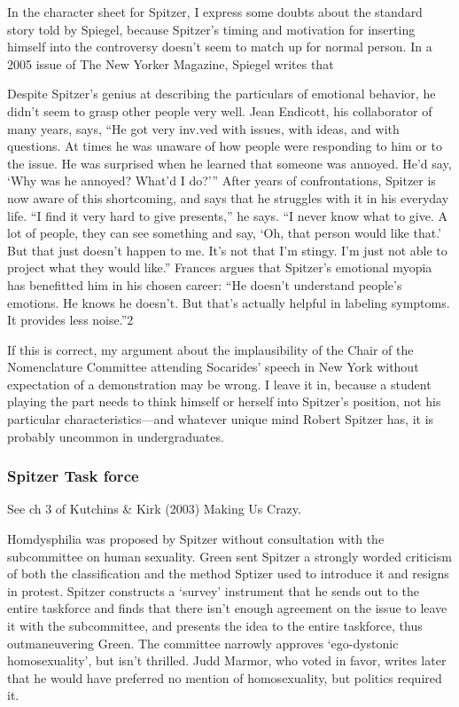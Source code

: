In the character sheet for Spitzer, I express some doubts about the standard story told by Spiegel, because Spitzer's timing and motivation for inserting himself into the controversy doesn't seem to match up for normal person. In a 2005 issue of The New Yorker Magazine, Spiegel writes that 

Despite Spitzer's genius at describing the particulars of emotional behavior, he didn't seem to grasp other people very well. Jean Endicott, his collaborator of many years, says, ``He got very inv.ved with issues, with ideas, and with questions. At times he was unaware of how people were responding to him or to the issue. He was surprised when he learned that someone was annoyed. He'd say, `Why was he annoyed? What'd I do?''' After years of confrontations, Spitzer is now aware of this shortcoming, and says that he struggles with it in his everyday life. ``I find it very hard to give presents,'' he says. ``I never know what to give. A lot of people, they can see something and say, `Oh, that person would like that.' But that just doesn't happen to me. It's not that I'm stingy. I'm just not able to project what they would like.'' Frances argues that Spitzer's emotional myopia has benefitted him in his chosen career: ``He doesn't understand people's emotions. He knows he doesn't. But that's actually helpful in labeling symptoms. It provides less noise.''2

If this is correct, my argument about the implausibility of the Chair of the Nomenclature Committee attending Socarides' speech in New York without expectation of a demonstration may be wrong. I leave it in, because a student playing the part needs to think himself or herself into Spitzer's position, not his particular characteristics---and whatever unique mind Robert Spitzer has, it is probably uncommon in undergraduates.

\subsubsection{Spitzer Task force}
\label{spitzertaskforce}

See ch 3 of Kutchins \& Kirk (2003) Making Us Crazy. 

Homdysphilia was proposed by Spitzer without consultation with the subcommittee on human sexuality. Green sent Spitzer a strongly worded criticism of both the classification and the method Sptizer used to introduce it and resigns in protest. Spitzer constructs a `survey' instrument that he sends out to the entire taskforce and finds that there isn't enough agreement on the issue to leave it with the subcommittee, and presents the idea to the entire taskforce, thus outmaneuvering Green. The committee narrowly approves `ego-dystonic homosexuality', but isn't thrilled. Judd Marmor, who voted in favor, writes later that he would have preferred no mention of homosexuality, but politics required it.

